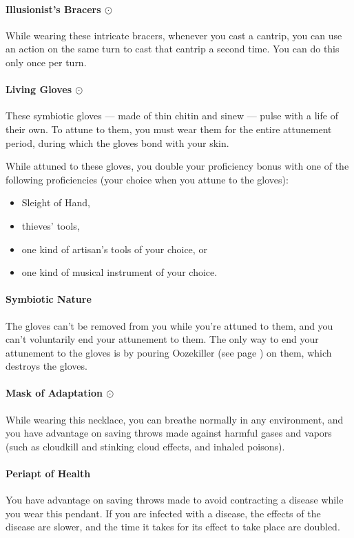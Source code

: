     \paragraph{Illusionist's Bracers $\odot$}
        While wearing these intricate bracers, whenever you cast a cantrip, you can use an action on the same turn to cast that cantrip a second time.
        You can do this only once per turn.
    \paragraph{Living Gloves $\odot$}
        These symbiotic gloves --- made of thin chitin and sinew --- pulse with a life of their own.
        To attune to them, you must wear them for the entire attunement period, during which the gloves bond with your skin.

        While attuned to these gloves, you double your proficiency bonus with one of the following proficiencies (your choice when you attune to the gloves):
        \begin{itemize}
            \item Sleight of Hand,
            \item thieves' tools,
            \item one kind of artisan's tools of your choice, or
            \item one kind of musical instrument of your choice.
        \end{itemize}

        \paragraph{Symbiotic Nature}
        The gloves can't be removed from you while you're attuned to them, and you can't voluntarily end your attunement to them.
        The only way to end your attunement to the gloves is by pouring Oozekiller (see page \pageref{item::oozekiller}) on them, which destroys the gloves.
    \paragraph{Mask of Adaptation $\odot$}
        While wearing this necklace, you can breathe normally in any environment, and you have advantage on saving throws made against harmful gases and vapors (such as cloudkill and stinking cloud effects, and inhaled poisons).
    \paragraph{Periapt of Health}
        You have advantage on saving throws made to avoid contracting a disease while you wear this pendant.
        If you are infected with a disease, the effects of the disease are slower, and the time it takes for its effect to take place are doubled.
